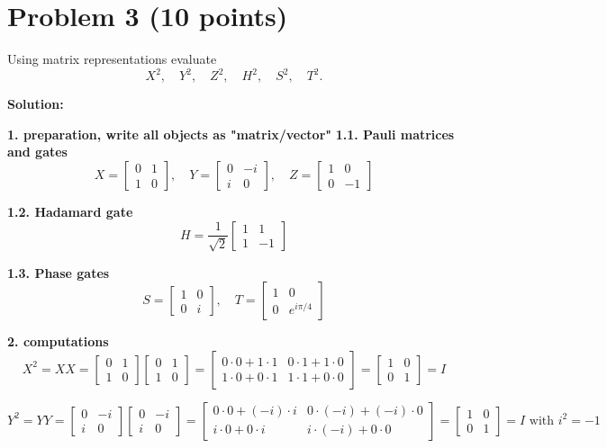\documentclass[11pt]{article}
\newenvironment{solution}
{\par\noindent\textbf{Solution:}\par}
{\vspace{1em}}
\begin{document}
\section*{Problem 3 (10 points)}
Using matrix representations evaluate
\[
X^2,\quad Y^2,\quad Z^2,\quad H^2,\quad S^2,\quad T^2.
\]
\begin{solution}

\textbf{1. preparation, write all objects as "matrix/vector"}
\textbf{1.1. Pauli matrices and gates}
\[
X = \begin{bmatrix}0&1\\1&0\end{bmatrix}, \quad Y = \begin{bmatrix}0&-i\\i&0\end{bmatrix}, \quad Z = \begin{bmatrix}1&0\\0&-1\end{bmatrix}
\]

\textbf{1.2. Hadamard gate}
\[
H = \frac{1}{\sqrt{2}}\begin{bmatrix}1&1\\1&-1\end{bmatrix}
\]

\textbf{1.3. Phase gates}
\[
S = \begin{bmatrix}1&0\\0&i\end{bmatrix}, \quad T = \begin{bmatrix}1&0\\0&e^{i\pi/4}\end{bmatrix}
\]

\textbf{2. computations}
\[
X^2 = XX = \begin{bmatrix}0&1\\1&0\end{bmatrix} \begin{bmatrix}0&1\\1&0\end{bmatrix} = \begin{bmatrix}0 \cdot 0 + 1 \cdot 1&0 \cdot 1 + 1 \cdot 0\\1 \cdot 0 + 0 \cdot 1&1 \cdot 1 + 0 \cdot 0\end{bmatrix} = \begin{bmatrix}1&0\\0&1\end{bmatrix} = \boxed{I}
\]

\[
Y^2 = YY = \begin{bmatrix}0&-i\\i&0\end{bmatrix} \begin{bmatrix}0&-i\\i&0\end{bmatrix} = \begin{bmatrix}0 \cdot 0 + (-i) \cdot i&0 \cdot (-i) + (-i) \cdot 0\\i \cdot 0 + 0 \cdot i&i \cdot (-i) + 0 \cdot 0\end{bmatrix} = \begin{bmatrix}1&0\\0&1\end{bmatrix} = \boxed{I} \text{ with } i^2 = -1
\]


\end{solution}
\end{document}
